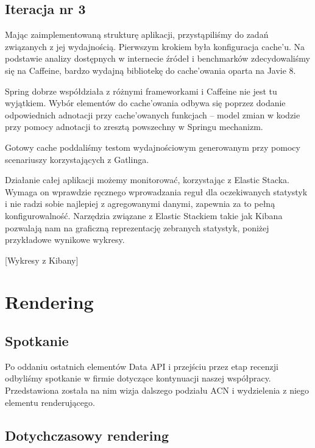 \documentclass[licencjacka]{pracamgr}
\begin{document}
\section{Iteracja nr 3}

Mając zaimplementowaną strukturę aplikacji, przystąpiliśmy do zadań związanych z jej wydajnością. Pierwszym krokiem była konfiguracja cache’u. Na podstawie analizy dostępnych w internecie źródeł i benchmarków zdecydowaliśmy się na Caffeine, bardzo wydajną bibliotekę do cache’owania oparta na Javie 8.

\vspace{1mm}

Spring dobrze współdziała z różnymi frameworkami i Caffeine nie jest tu wyjątkiem. Wybór elementów do cache’owania odbywa się poprzez dodanie odpowiednich adnotacji przy cache’owanych funkcjach – model zmian w kodzie przy pomocy adnotacji to zresztą powszechny w Springu mechanizm.

\vspace{1mm}

Gotowy cache poddaliśmy testom wydajnościowym generowanym przy pomocy scenariuszy korzystających z Gatlinga.

\vspace{1mm}

Działanie całej aplikacji możemy monitorować, korzystając z Elastic Stacka. Wymaga on wprawdzie ręcznego wprowadzania reguł dla oczekiwanych statystyk i nie radzi sobie najlepiej z agregowanymi danymi, zapewnia za to pełną konfigurowalność. Narzędzia związane z Elastic Stackiem takie jak Kibana pozwalają nam na graficzną reprezentację zebranych statystyk, poniżej przykładowe wynikowe wykresy.

	[Wykresy z Kibany]

\chapter{Rendering}

\section{Spotkanie}

Po oddaniu ostatnich elementów Data API i przejściu przez etap recenzji odbyliśmy spotkanie w firmie dotyczące kontynuacji naszej współpracy. Przedstawiona została na nim wizja dalszego podziału ACN i wydzielenia z niego elementu renderującego.

\section{Dotychczasowy rendering}
\end{document}

